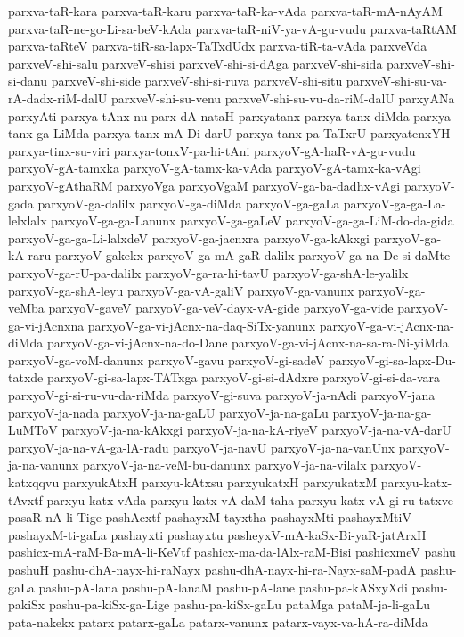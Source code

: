 {parxva-taR-kara
parxva-taR-karu
parxva-taR-ka-vAda
parxva-taR-mA-nAyAM
parxva-taR-ne-go-Li-sa-beV-kAda
parxva-taR-niV-ya-vA-gu-vudu
parxva-taRtAM
parxva-taRteV
parxva-tiR-sa-lapx-TaTxdUdx
parxva-tiR-ta-vAda
parxveVda
parxveV-shi-salu
parxveV-shisi
parxveV-shi-si-dAga
parxveV-shi-sida
parxveV-shi-si-danu
parxveV-shi-side
parxveV-shi-si-ruva
parxveV-shi-situ
parxveV-shi-su-va-rA-dadx-riM-dalU
parxveV-shi-su-venu
parxveV-shi-su-vu-da-riM-dalU
parxyANa
parxyAti
parxya-tAnx-nu-parx-dA-nataH
parxyatanx
parxya-tanx-diMda
parxya-tanx-ga-LiMda
parxya-tanx-mA-Di-darU
parxya-tanx-pa-TaTxrU
parxyatenxYH
parxya-tinx-su-viri
parxya-tonxV-pa-hi-tAni
parxyoV-gA-haR-vA-gu-vudu
parxyoV-gA-tamxka
parxyoV-gA-tamx-ka-vAda
parxyoV-gA-tamx-ka-vAgi
parxyoV-gAthaRM
parxyoVga
parxyoVgaM
parxyoV-ga-ba-dadhx-vAgi
parxyoV-gada
parxyoV-ga-dalilx
parxyoV-ga-diMda
parxyoV-ga-gaLa
parxyoV-ga-ga-La-lelxlalx
parxyoV-ga-ga-Lanunx
parxyoV-ga-gaLeV
parxyoV-ga-ga-LiM-do-da-gida
parxyoV-ga-ga-Li-lalxdeV
parxyoV-ga-jacnxra
parxyoV-ga-kAkxgi
parxyoV-ga-kA-raru
parxyoV-gakekx
parxyoV-ga-mA-gaR-dalilx
parxyoV-ga-na-De-si-daMte
parxyoV-ga-rU-pa-dalilx
parxyoV-ga-ra-hi-tavU
parxyoV-ga-shA-le-yalilx
parxyoV-ga-shA-leyu
parxyoV-ga-vA-galiV
parxyoV-ga-vanunx
parxyoV-ga-veMba
parxyoV-gaveV
parxyoV-ga-veV-dayx-vA-gide
parxyoV-ga-vide
parxyoV-ga-vi-jAcnxna
parxyoV-ga-vi-jAcnx-na-daq-SiTx-yanunx
parxyoV-ga-vi-jAcnx-na-diMda
parxyoV-ga-vi-jAcnx-na-do-Dane
parxyoV-ga-vi-jAcnx-na-sa-ra-Ni-yiMda
parxyoV-ga-voM-danunx
parxyoV-gavu
parxyoV-gi-sadeV
parxyoV-gi-sa-lapx-Du-tatxde
parxyoV-gi-sa-lapx-TATxga
parxyoV-gi-si-dAdxre
parxyoV-gi-si-da-vara
parxyoV-gi-si-ru-vu-da-riMda
parxyoV-gi-suva
parxyoV-ja-nAdi
parxyoV-jana
parxyoV-ja-nada
parxyoV-ja-na-gaLU
parxyoV-ja-na-gaLu
parxyoV-ja-na-ga-LuMToV
parxyoV-ja-na-kAkxgi
parxyoV-ja-na-kA-riyeV
parxyoV-ja-na-vA-darU
parxyoV-ja-na-vA-ga-lA-radu
parxyoV-ja-navU
parxyoV-ja-na-vanUnx
parxyoV-ja-na-vanunx
parxyoV-ja-na-veM-bu-danunx
parxyoV-ja-na-vilalx
parxyoV-katxqqvu
parxyukAtxH
parxyu-kAtxsu
parxyukatxH
parxyukatxM
parxyu-katx-tAvxtf
parxyu-katx-vAda
parxyu-katx-vA-daM-taha
parxyu-katx-vA-gi-ru-tatxve
pasaR-nA-li-Tige
pashAcxtf
pashayxM-tayxtha
pashayxMti
pashayxMtiV
pashayxM-ti-gaLa
pashayxti
pashayxtu
pasheyxV-mA-kaSx-Bi-yaR-jatArxH
pashicx-mA-raM-Ba-mA-li-KeVtf
pashicx-ma-da-lAlx-raM-Bisi
pashicxmeV
pashu
pashuH
pashu-dhA-nayx-hi-raNayx
pashu-dhA-nayx-hi-ra-Nayx-saM-padA
pashu-gaLa
pashu-pA-lana
pashu-pA-lanaM
pashu-pA-lane
pashu-pa-kASxyXdi
pashu-pakiSx
pashu-pa-kiSx-ga-Lige
pashu-pa-kiSx-gaLu
pataMga
pataM-ja-li-gaLu
pata-nakekx
patarx
patarx-gaLa
patarx-vanunx
patarx-vayx-va-hA-ra-diMda
}
